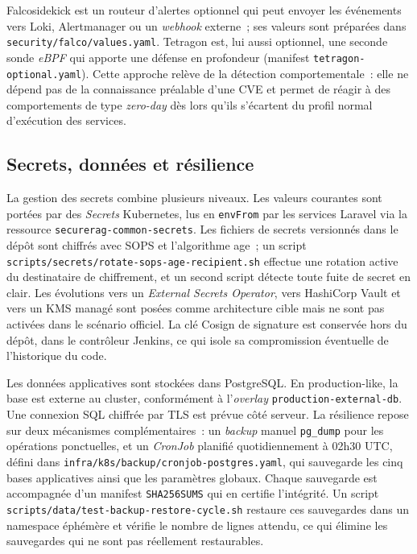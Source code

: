 Falcosidekick est un routeur d'alertes optionnel qui peut envoyer les
événements vers Loki, Alertmanager ou un \emph{webhook} externe~; ses
valeurs sont préparées dans \texttt{security/falco/values.yaml}. Tetragon
est, lui aussi optionnel, une seconde sonde \emph{eBPF} qui apporte une
défense en profondeur (manifest \texttt{tetragon-optional.yaml}). Cette
approche relève de la détection comportementale~: elle ne dépend pas de
la connaissance préalable d'une CVE et permet de réagir à des
comportements de type \emph{zero-day} dès lors qu'ils s'écartent du
profil normal d'exécution des services.

\subsection{Secrets, données et résilience}
\label{subsec:concepts-data}

La gestion des secrets combine plusieurs niveaux. Les valeurs courantes
sont portées par des \emph{Secrets} Kubernetes, lus en \texttt{envFrom}
par les services Laravel via la ressource
\texttt{securerag-common-secrets}. Les fichiers de secrets versionnés
dans le dépôt sont chiffrés avec SOPS et l'algorithme age~; un script
\texttt{scripts/secrets/rotate-sops-age-recipient.sh} effectue une
rotation active du destinataire de chiffrement, et un second script
détecte toute fuite de secret en clair. Les évolutions vers un
\emph{External Secrets Operator}, vers HashiCorp Vault et vers un KMS
managé sont posées comme architecture cible mais ne sont pas activées
dans le scénario officiel. La clé Cosign de signature est conservée hors
du dépôt, dans le contrôleur Jenkins, ce qui isole sa compromission
éventuelle de l'historique du code.

Les données applicatives sont stockées dans PostgreSQL. En production-like,
la base est externe au cluster, conformément à l'\emph{overlay}
\texttt{production-external-db}. Une connexion SQL chiffrée par TLS est
prévue côté serveur. La résilience repose sur deux mécanismes
complémentaires~: un \emph{backup} manuel \texttt{pg\_dump} pour les
opérations ponctuelles, et un \emph{CronJob} planifié quotidiennement à
02h30 UTC, défini dans \texttt{infra/k8s/backup/cronjob-postgres.yaml},
qui sauvegarde les cinq bases applicatives ainsi que les paramètres
globaux. Chaque sauvegarde est accompagnée d'un manifest
\texttt{SHA256SUMS} qui en certifie l'intégrité. Un script
\texttt{scripts/data/test-backup-restore-cycle.sh} restaure ces
sauvegardes dans un namespace éphémère et vérifie le nombre de lignes
attendu, ce qui élimine les sauvegardes qui ne sont pas réellement
restaurables.

